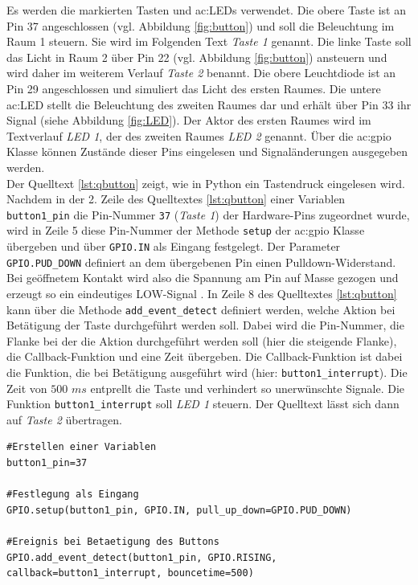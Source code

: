 Es werden die markierten Tasten und \gls{ac:LED}s verwendet. Die obere Taste ist an Pin 37 angeschlossen (vgl. Abbildung \ref{fig:button}) und soll die Beleuchtung im Raum 1 steuern. Sie wird im Folgenden Text \textit{Taste 1} genannt. Die linke Taste soll das Licht in Raum 2 über Pin 22 (vgl. Abbildung \ref{fig:button}) ansteuern und wird daher im weiterem Verlauf \textit{Taste 2} benannt. Die obere Leuchtdiode ist an Pin 29 angeschlossen und simuliert das Licht des ersten Raumes. Die untere \gls{ac:LED} stellt die Beleuchtung des zweiten Raumes dar und erhält über Pin 33 ihr Signal (siehe Abbildung \ref{fig:LED}). Der Aktor des ersten Raumes wird im Textverlauf \textit{LED 1}, der des zweiten Raumes \textit{LED 2} genannt. Über die \gls{ac:gpio} Klasse können Zustände dieser Pins eingelesen und Signaländerungen ausgegeben werden.\\[0,2cm]

Der Quelltext \ref{lst:qbutton} zeigt, wie in Python ein Tastendruck eingelesen wird. Nachdem in der 2. Zeile des Quelltextes \ref{lst:qbutton} einer Variablen \texttt{button1\_pin} die Pin-Nummer \texttt{37} (\textit{Taste 1}) der Hardware-Pins zugeordnet wurde, wird in Zeile 5 diese Pin-Nummer der Methode \texttt{setup} der \gls{ac:gpio} Klasse übergeben und über \texttt{GPIO.IN} als Eingang festgelegt. Der Parameter \texttt{GPIO.PUD\_DOWN} definiert an dem übergebenen Pin einen Pulldown-Widerstand. Bei geöffnetem Kontakt wird also die Spannung am Pin auf Masse gezogen und erzeugt so ein eindeutiges LOW-Signal \cite{latex:pulld}. In Zeile 8 des Quelltextes  \ref{lst:qbutton} kann über die Methode \texttt{add\_event\_detect} definiert werden, welche Aktion bei Betätigung der Taste durchgeführt werden soll. Dabei wird die Pin-Nummer, die Flanke bei der die Aktion durchgeführt werden soll (hier die steigende Flanke), die Callback-Funktion und eine Zeit übergeben. Die Callback-Funktion ist dabei die Funktion, die bei Betätigung ausgeführt wird (hier: \texttt{button1\_interrupt}). Die Zeit von $500$ $ms$ entprellt die Taste und verhindert so unerwünschte Signale. Die Funktion \texttt{button1\_interrupt} soll \textit{LED 1} steuern. Der Quelltext lässt sich dann auf \textit{Taste 2} übertragen.\\

\begin{lstlisting}[style=python, caption=Python-Code zum Einlesen des Tastenzustandes, label=lst:qbutton]
#Erstellen einer Variablen 
button1_pin=37
 
#Festlegung als Eingang
GPIO.setup(button1_pin, GPIO.IN, pull_up_down=GPIO.PUD_DOWN)

#Ereignis bei Betaetigung des Buttons
GPIO.add_event_detect(button1_pin, GPIO.RISING, callback=button1_interrupt, bouncetime=500)
\end{lstlisting}



